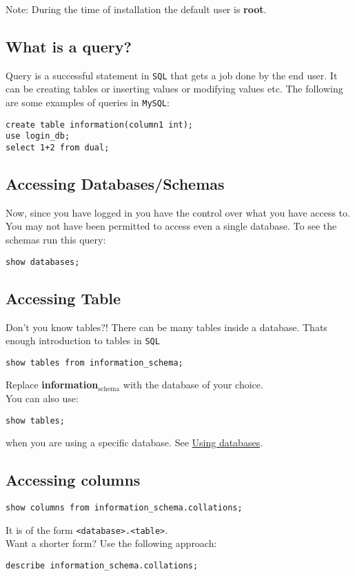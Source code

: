 \documentclass[11pt]{article}
\begin{document}
Note: During the time of installation the default user is \textbf{root}.
\subsection{What is a query?}
\label{sec:orgheadline3}
Query is a successful statement in \texttt{SQL} that gets a job done
by the end user. It can be creating tables or inserting values
or modifying values etc. The following are some examples of
queries in \texttt{MySQL}:
\begin{verbatim}
create table information(column1 int);
use login_db;
select 1+2 from dual;
\end{verbatim}
\subsection{Accessing Databases/Schemas}
\label{sec:orgheadline4}
Now, since you have logged in you have the control over what
you have access to. You may not have been permitted to access
even a single database. To see the schemas run this query:
\begin{verbatim}
show databases;
\end{verbatim}
\subsection{Accessing Table}
\label{sec:orgheadline6}
Don't you know tables?!
There can be many tables inside a database. Thats enough
introduction to tables in \texttt{SQL}
\begin{verbatim}
show tables from information_schema;
\end{verbatim}
Replace \textbf{information\(_{\text{schema}}\)} with the database of your
choice.\\
You can also use:
\begin{verbatim}
show tables;
\end{verbatim}
when you are using a specific database. See \hyperref[sec:orgheadline5]{Using databases}.
\subsection{Accessing columns}
\label{sec:orgheadline8}
\begin{verbatim}
show columns from information_schema.collations;
\end{verbatim}
It is of the form \texttt{<database>.<table>}.\\
Want a shorter form? Use the following approach:
\begin{verbatim}
describe information_schema.collations;
\end{verbatim}
\end{document}
